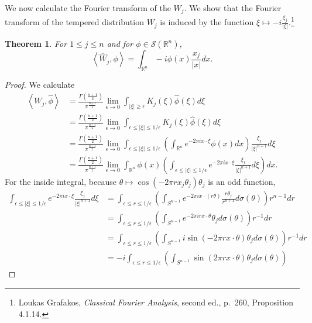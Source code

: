 \documentclass{article}
\newcommand{\inner}[2]{\left\langle #1, #2 \right\rangle}
\newtheorem{theorem}{Theorem}
\theoremstyle{definition}
\begin{document}
We now calculate the Fourier transform
of the $W_j$.
We show that the Fourier transform of the tempered distribution $W_j$
is  induced by the function $\xi \mapsto -i \frac{\xi_j}{|\xi|}$.\footnote{Loukas Grafakos, {\em Classical Fourier Analysis}, second ed.,
p.~260, Proposition 4.1.14.}

\begin{theorem}
For $1 \leq j \leq n$ and for $\phi \in \mathscr{S}(\mathbb{R}^n)$,
\[
\inner{\widehat{W}_j}{\phi} = \int_{\mathbb{R}^n} -i \phi(x) \frac{x_j}{|x|} dx.
\]
\label{Wjtheorem}
\end{theorem}
\begin{proof}
We calculate
\begin{align*}
\inner{W_j}{\widehat{\phi}}&= \frac{\Gamma\left(\frac{n+1}{2}\right)}{\pi^{\frac{n+1}{2}}} \lim_{\epsilon \to 0}
\int_{|\xi| \geq \epsilon}K_j(\xi) \widehat{\phi}(\xi)  d\xi\\
&= \frac{\Gamma\left(\frac{n+1}{2}\right)}{\pi^{\frac{n+1}{2}}} \lim_{\epsilon \to 0}
\int_{\epsilon \leq |\xi| \leq 1/\epsilon}K_j(\xi) \widehat{\phi}(\xi)  d\xi\\
&=\frac{\Gamma\left(\frac{n+1}{2}\right)}{\pi^{\frac{n+1}{2}}} \lim_{\epsilon \to 0}
\int_{\epsilon \leq |\xi| \leq 1/\epsilon} \left(\int_{\mathbb{R}^n} e^{-2\pi ix\cdot \xi} \phi(x) dx\right)
\frac{\xi_j}{|\xi|^{n+1}} d\xi\\
&=\frac{\Gamma\left(\frac{n+1}{2}\right)}{\pi^{\frac{n+1}{2}}} \lim_{\epsilon \to 0} \int_{\mathbb{R}^n}
\phi(x) \left( \int_{\epsilon \leq |\xi| \leq 1/\epsilon} e^{-2\pi ix\cdot \xi} \frac{\xi_j}{|\xi|^{n+1}} d\xi \right) dx.
\end{align*}
For the inside integral, because $\theta \mapsto \cos(-2\pi rx_j \theta_j) \theta_j$  is an odd function,
\begin{align*}
 \int_{\epsilon \leq |\xi| \leq 1/\epsilon} e^{-2\pi ix\cdot \xi} \frac{\xi_j}{|\xi|^{n+1}} d\xi&=
 \int_{\epsilon \leq r \leq 1/\epsilon} \left( \int_{S^{n-1}} e^{-2\pi ix\cdot (r\theta)} 
\frac{r\theta_j}{r^{n+1}} d\sigma(\theta) \right) r^{n-1} dr \\
&=
 \int_{\epsilon \leq r \leq 1/\epsilon} \left( \int_{S^{n-1}} e^{-2\pi ir x\cdot \theta} 
\theta_j d\sigma(\theta) \right) r^{-1} dr \\
&= \int_{\epsilon \leq r \leq 1/\epsilon} \left( \int_{S^{n-1}} i\sin(-2\pi rx\cdot \theta) \theta_j d\sigma(\theta) \right)
r^{-1} dr\\
&= -i \int_{\epsilon \leq r \leq 1/\epsilon}\left( \int_{S^{n-1}} \sin(2\pi rx\cdot\theta) \theta_j d\sigma(\theta) \right)

\end{align*}
\end{proof}
\end{document}
